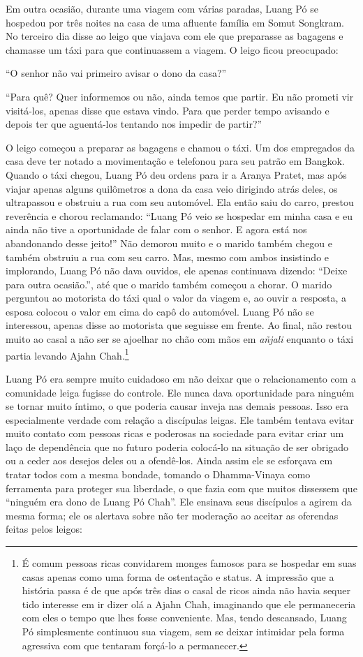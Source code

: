 Em outra ocasião, durante uma viagem com várias paradas, Luang Pó se
hospedou por três noites na casa de uma afluente família em Somut
Songkram. No terceiro dia disse ao leigo que viajava com ele que
preparasse as bagagens e chamasse um táxi para que continuassem a
viagem. O leigo ficou preocupado:

``O senhor não vai primeiro avisar o dono da casa?''

``Para quê? Quer informemos ou não, ainda temos que partir. Eu não
prometi vir visitá-los, apenas disse que estava vindo. Para que perder
tempo avisando e depois ter que aguentá-los tentando nos impedir de
partir?''

O leigo começou a preparar as bagagens e chamou o táxi. Um dos
empregados da casa deve ter notado a movimentação e telefonou para seu
patrão em Bangkok. Quando o táxi chegou, Luang Pó deu ordens para ir a
Aranya Pratet, mas após viajar apenas alguns quilômetros a dona da casa
veio dirigindo atrás deles, os ultrapassou e obstruiu a rua com seu
automóvel. Ela então saiu do carro, prestou reverência e chorou
reclamando: ``Luang Pó veio se hospedar em minha casa e eu ainda não
tive a oportunidade de falar com o senhor. E agora está nos abandonando
desse jeito!'' Não demorou muito e o marido também chegou e também
obstruiu a rua com seu carro. Mas, mesmo com ambos insistindo e
implorando, Luang Pó não dava ouvidos, ele apenas continuava dizendo:
``Deixe para outra ocasião.'', até que o marido também começou a chorar.
O marido perguntou ao motorista do táxi qual o valor da viagem e, ao
ouvir a resposta, a esposa colocou o valor em cima do capô do automóvel.
Luang Pó não se interessou, apenas disse ao motorista que seguisse em
frente. Ao final, não restou muito ao casal a não ser se ajoelhar no
chão com mãos em \emph{añjali} enquanto o táxi partia levando Ajahn
Chah.\footnote{É comum pessoas ricas convidarem monges famosos para se
  hospedar em suas casas apenas como uma forma de ostentação e status. A
  impressão que a história passa é de que após três dias o casal de
  ricos ainda não havia sequer tido interesse em ir dizer olá a Ajahn
  Chah, imaginando que ele permaneceria com eles o tempo que lhes fosse
  conveniente. Mas, tendo descansado, Luang Pó simplesmente continuou
  sua viagem, sem se deixar intimidar pela forma agressiva com que
  tentaram forçá-lo a permanecer.}

Luang Pó era sempre muito cuidadoso em não deixar que o relacionamento
com a comunidade leiga fugisse do controle. Ele nunca dava oportunidade
para ninguém se tornar muito íntimo, o que poderia causar inveja nas
demais pessoas. Isso era especialmente verdade com relação a discípulas
leigas. Ele também tentava evitar muito contato com pessoas ricas e
poderosas na sociedade para evitar criar um laço de dependência que no
futuro poderia colocá-lo na situação de ser obrigado ou a ceder aos
desejos deles ou a ofendê-los. Ainda assim ele se esforçava em tratar
todos com a mesma bondade, tomando o Dhamma-Vinaya como ferramenta para
proteger sua liberdade, o que fazia com que muitos dissessem que
``ninguém era dono de Luang Pó Chah''. Ele ensinava seus discípulos a
agirem da mesma forma; ele os alertava sobre não ter moderação ao
aceitar as oferendas feitas pelos leigos:

